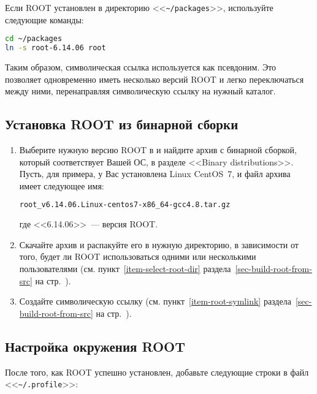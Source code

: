 \documentclass[12pt, a4paper, oneside, onecolumn]{book}
\newcommand{\ROOT}{\mbox{ROOT}}
\newcommand{\DIRECTORY}[1]{<<{\tt #1}>>}
\newcommand{\FILE}[1]{<<{\tt #1}>>}
\begin{document}
\begin{enumerate}
Если \ROOT{} установлен в директорию \DIRECTORY{\~{}/packages}, используйте следующие команды:

\begin{lstlisting}[language=bash]
cd ~/packages
ln -s root-6.14.06 root
\end{lstlisting}

Таким образом, символическая ссылка используется как псевдоним. Это позволяет одновременно иметь несколько версий \ROOT{} и легко переключаться между ними, перенаправляя символическую ссылку на нужный каталог.

\end{enumerate}

\subsection{Установка \ROOT{} из бинарной сборки}

\begin{enumerate}

\item Выберите нужную версию \ROOT{} в \cite{RootDownload} и найдите архив с бинарной сборкой, который соответствует Вашей ОС, в разделе <<Binary distributions>>. Пусть, для примера, у Вас установлена Linux CentOS~7, и файл архива имеет следующее имя:

\begin{lstlisting}[language=bash]
root_v6.14.06.Linux-centos7-x86_64-gcc4.8.tar.gz
\end{lstlisting}
 
\noindent где <<6.14.06>>~--- версия \ROOT{}.

\item Скачайте архив и распакуйте его в нужную директорию, в зависимости от того, будет ли \ROOT{} использоваться одними или несколькими пользователями (см. пункт~\ref{item-select-root-dir} раздела~\ref{sec-build-root-from-src} на стр.~\pageref{item-select-root-dir}).

\item Создайте символическую ссылку (см. пункт~\ref{item-root-symlink} раздела~\ref{sec-build-root-from-src} на стр.~\pageref{item-root-symlink}).
\end{enumerate}

\subsection{Настройка окружения \ROOT{}}

После того, как \ROOT{} успешно установлен, добавьте следующие строки в файл \FILE{\~{}/.profile}:
\end{document}
